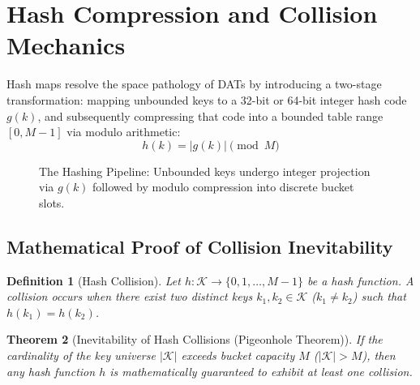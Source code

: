 \documentclass[10pt,twocolumn,letterpaper]{article}
\newtheorem{theorem}{Theorem}
\newtheorem{definition}[theorem]{Definition}
\begin{document}
\section{Hash Compression and Collision Mechanics}
\label{sec:compression}

Hash maps resolve the space pathology of DATs by introducing a two-stage transformation: mapping unbounded keys to a 32-bit or 64-bit integer hash code $g(k)$, and subsequently compressing that code into a bounded table range $[0, M-1]$ via modulo arithmetic:
\[
h(k) = |g(k)| \pmod M
\]

\begin{figure}[htbp]
\centering
{}
\caption{The Hashing Pipeline: Unbounded keys undergo integer projection via $g(k)$ followed by modulo compression into discrete bucket slots.}
\label{fig:hash-pipeline}
\end{figure}

\subsection{Mathematical Proof of Collision Inevitability}

\begin{definition}[Hash Collision]
Let $h: \mathcal{K} \to \{0, 1, \dots, M-1\}$ be a hash function. A collision occurs when there exist two distinct keys $k_1, k_2 \in \mathcal{K}$ ($k_1 \neq k_2$) such that $h(k_1) = h(k_2)$.
\end{definition}

\begin{theorem}[Inevitability of Hash Collisions (Pigeonhole Theorem)]
If the cardinality of the key universe $|\mathcal{K}|$ exceeds bucket capacity $M$ ($|\mathcal{K}| > M$), then any hash function $h$ is mathematically guaranteed to exhibit at least one collision.
\end{theorem}
\end{document}
